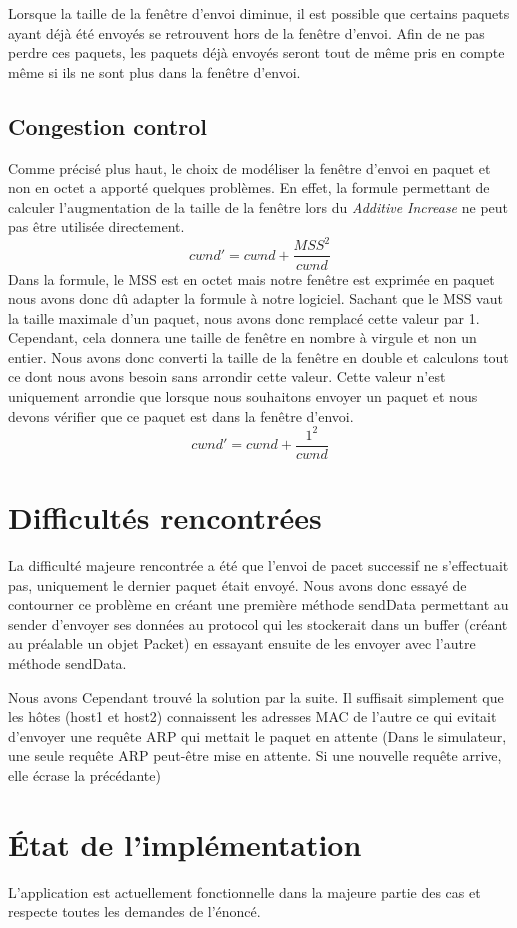 \documentclass{article}
\begin{document}
Lorsque la taille de la fenêtre d'envoi diminue, il est possible que certains paquets ayant déjà été envoyés se retrouvent hors de la fenêtre d'envoi.
Afin de ne pas perdre ces paquets, les paquets déjà envoyés seront tout de même pris en compte même si ils ne sont plus dans la fenêtre d'envoi.


\subsection{Congestion control}
Comme précisé plus haut, le choix de modéliser la fenêtre d'envoi en paquet et non en octet a apporté quelques problèmes.
En effet, la formule permettant de calculer l'augmentation de la taille de la fenêtre lors du \textit{Additive Increase}
ne peut pas être utilisée directement.
\[
    cwnd' = cwnd + \frac{MSS^2}{cwnd}
\]
Dans la formule, le MSS est en octet mais notre fenêtre est exprimée en paquet nous avons donc dû adapter la formule à notre logiciel.
Sachant que le MSS vaut la taille maximale d'un paquet, nous avons donc remplacé cette valeur par 1.
Cependant, cela donnera une taille de fenêtre en nombre à virgule et non un entier. Nous avons donc converti la taille de la fenêtre
en double et calculons tout ce dont nous avons besoin sans arrondir cette valeur.
Cette valeur n'est uniquement arrondie que lorsque nous souhaitons envoyer un paquet et nous devons vérifier que ce paquet est dans la fenêtre d'envoi.
\[
    cwnd' = cwnd + \frac{1^2}{cwnd}
\]  

\newpage

\section{Difficultés rencontrées}
La difficulté majeure rencontrée a été que l'envoi de pacet successif ne s'effectuait pas, uniquement le dernier paquet était envoyé.
Nous avons donc essayé de contourner ce problème en créant une première méthode sendData permettant au sender d'envoyer ses données au protocol
qui les stockerait dans un buffer (créant au préalable un objet Packet) en essayant ensuite de les envoyer avec l'autre méthode sendData.

Nous avons Cependant trouvé la solution par la suite. Il suffisait simplement que les hôtes (host1 et host2) connaissent
les adresses MAC de l'autre ce qui evitait d'envoyer une requête ARP qui mettait le paquet en attente (Dans le simulateur, une seule requête ARP peut-être mise en attente. Si une nouvelle requête arrive, elle écrase la précédante)

\section{\'Etat de l'implémentation}
L'application est actuellement fonctionnelle dans la majeure partie des cas et respecte toutes les demandes de l'énoncé.
\end{document}
